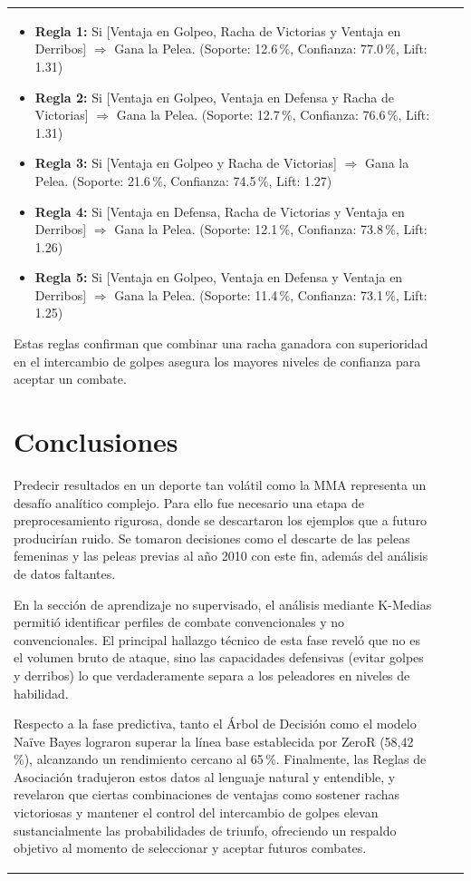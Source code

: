 \documentclass[11pt,a4paper]{article}
\begin{document}
\begin{longtable}{>{\raggedright\arraybackslash}p{5.6cm}>{\raggedright\arraybackslash}p{1.3cm}>{\raggedright\arraybackslash}p{5.1cm}}
\begin{itemize}
    \item \textbf{Regla 1:} Si [Ventaja en Golpeo, Racha de Victorias y Ventaja en Derribos] $\Rightarrow$ Gana la Pelea. (Soporte: 12.6\,\%, Confianza: 77.0\,\%, Lift: 1.31)
    \item \textbf{Regla 2:} Si [Ventaja en Golpeo, Ventaja en Defensa y Racha de Victorias] $\Rightarrow$ Gana la Pelea. (Soporte: 12.7\,\%, Confianza: 76.6\,\%, Lift: 1.31)
    \item \textbf{Regla 3:} Si [Ventaja en Golpeo y Racha de Victorias] $\Rightarrow$ Gana la Pelea. (Soporte: 21.6\,\%, Confianza: 74.5\,\%, Lift: 1.27)
    \item \textbf{Regla 4:} Si [Ventaja en Defensa, Racha de Victorias y Ventaja en Derribos] $\Rightarrow$ Gana la Pelea. (Soporte: 12.1\,\%, Confianza: 73.8\,\%, Lift: 1.26)
    \item \textbf{Regla 5:} Si [Ventaja en Golpeo, Ventaja en Defensa y Ventaja en Derribos] $\Rightarrow$ Gana la Pelea. (Soporte: 11.4\,\%, Confianza: 73.1\,\%, Lift: 1.25)
\end{itemize}

Estas reglas confirman que combinar una racha ganadora con superioridad en el intercambio de golpes asegura los mayores niveles de confianza para aceptar un combate.

\pagebreak
\section{Conclusiones}

Predecir resultados en un deporte tan volátil como la MMA representa un desafío analítico complejo. Para ello fue necesario una etapa de preprocesamiento rigurosa, donde se descartaron los ejemplos que a futuro producirían ruido. Se tomaron decisiones como el descarte de las peleas femeninas y las peleas previas al año 2010 con este fin, además del análisis de datos faltantes. 

En la sección de aprendizaje no supervisado, el análisis mediante K-Medias permitió identificar perfiles de combate convencionales y no convencionales. El principal hallazgo técnico de esta fase reveló que no es el volumen bruto de ataque, sino las capacidades defensivas (evitar golpes y derribos) lo que verdaderamente separa a los peleadores en niveles de habilidad.

Respecto a la fase predictiva, tanto el Árbol de Decisión como el modelo Naïve Bayes lograron superar la línea base establecida por ZeroR (58,42\,\%), alcanzando un rendimiento cercano al 65\,\%. Finalmente, las Reglas de Asociación tradujeron estos datos al lenguaje natural y entendible, y revelaron que ciertas combinaciones de ventajas como sostener rachas victoriosas y mantener el control del intercambio de golpes elevan sustancialmente las probabilidades de triunfo, ofreciendo un respaldo objetivo al momento de seleccionar y aceptar futuros combates.


\end{longtable}
\end{document}
